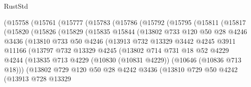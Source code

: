 \begin{lexlean}{RustStd}
\begin{coremodule}
      (@15758
        (@15761
          (@15777
            (@15783
              (@15786
                (@15792
                  (@15795
                    (@15811
                      (@15817
                        (@15820
                          (@15826
                            (@15829
                              (@15835
                                @15844
                                (@13802
                                  @733
                                  @120
                                  @50
                                  @28
                                  @4246
                                  @3436
                                  (@13810
                                    @733
                                    @50
                                    @4246
                                    (@13913
                                      @732
                                      @13329
                                      @3442
                                      @4245
                                      @3911
                                      @11166
                                      (@13797
                                        @732
                                        @13329
                                        @4245
                                        (@13802
                                          @714
                                          @731
                                          @18
                                          @52
                                          @4229
                                          @4244
                                          (@13835
                                            @713
                                            @4229
                                            (@10830 (@10831 @4229))
                                            (@10646 (@10836 @713 @18)))
                                          (@13802
                                            @729
                                            @120
                                            @50
                                            @28
                                            @4242
                                            @3436
                                            (@13810
                                              @729
                                              @50
                                              @4242
                                              (@13913
                                                @728
                                                @13329

\end{coremodule}
\end{lexlean}
